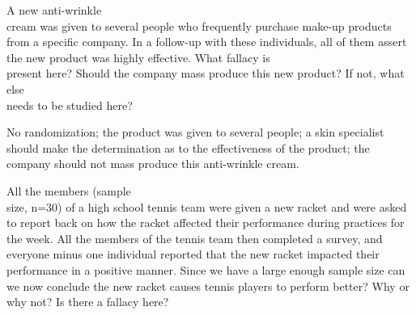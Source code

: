 \documentclass[11pt]{book}\usepackage[]{graphicx}\usepackage[]{color}
\begin{document}
\begin{exercises}
\begin{exercise}

  \end{exercise}

\begin{exercise}  %

A new anti-wrinkle \\ cream was given to several people who frequently purchase make-up products from a specific  company.  In a follow-up with these individuals, all of them assert the new product was highly effective.  What fallacy is \\ present here?  Should the company mass produce this new product? If not, what else \\ needs to be studied here?

\end{exercise}
\begin{solution}  %

No randomization; the product was given to several people; a skin specialist should make the determination as to the effectiveness of the product; the company should not mass produce this anti-wrinkle cream.

\end{solution}

\begin{exercise}  %

All the members (sample \\ size, n=30) of a high school tennis team were given a new racket and were asked to report back on how the racket affected their performance during practices for the week.  All the members of the tennis team then completed a survey, and everyone minus one individual reported that the new racket impacted their performance in a positive manner.  Since we have a large enough sample size can we now conclude the new racket causes tennis players to perform better?  Why or why not?  Is there a fallacy here?

	\end{exercise}

\begin{exercise}   %


\end{exercise}
\end{exercises}
\end{document}
